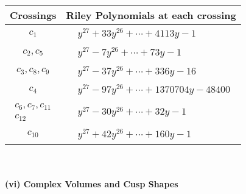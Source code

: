 \documentclass[1p]{elsarticle_modified}
\theoremstyle{definition}
\begin{document}
\begin{tabular}{m{50pt}|m{274pt}}
Crossings & \hspace{64pt}Riley Polynomials at each crossing \\
\hline $$\begin{aligned}c_{1}\end{aligned}$$&$\begin{aligned}
&y^{27}+33 y^{26}+\cdots+4113 y-1
\end{aligned}$\\
\hline $$\begin{aligned}c_{2},c_{5}\end{aligned}$$&$\begin{aligned}
&y^{27}-7 y^{26}+\cdots+73 y-1
\end{aligned}$\\
\hline $$\begin{aligned}c_{3},c_{8},c_{9}\end{aligned}$$&$\begin{aligned}
&y^{27}-37 y^{26}+\cdots+336 y-16
\end{aligned}$\\
\hline $$\begin{aligned}c_{4}\end{aligned}$$&$\begin{aligned}
&y^{27}-97 y^{26}+\cdots+1370704 y-48400
\end{aligned}$\\
\hline $$\begin{aligned}c_{6},c_{7},c_{11}\\c_{12}\end{aligned}$$&$\begin{aligned}
&y^{27}-30 y^{26}+\cdots+32 y-1
\end{aligned}$\\
\hline $$\begin{aligned}c_{10}\end{aligned}$$&$\begin{aligned}
&y^{27}+42 y^{26}+\cdots+160 y-1
\end{aligned}$\\
\hline
\end{tabular}\\~\\
\newpage\flushleft \textbf{(vi) Complex Volumes and Cusp Shapes}
\end{document}
